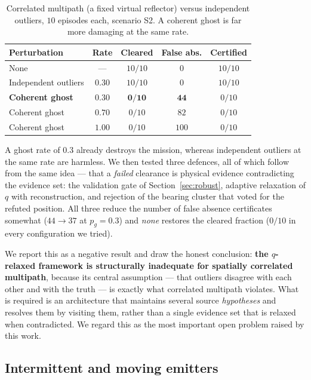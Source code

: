 \documentclass[journal,10pt]{IEEEtran}
\theoremstyle{definition}
\begin{document}
\begin{table}[t]
\caption{Correlated multipath (a fixed virtual reflector) versus independent outliers, $10$
episodes each, scenario S2. A coherent ghost is far more damaging at the same rate.}
\label{tab:ghost}
\centering
\small
\begin{tabular}{lcccc}
\toprule
Perturbation & Rate & Cleared & \textbf{False abs.} & Certified \\
\midrule
None                        & ---   & $10/10$ & $0$   & $10/10$ \\
Independent outliers        & $0.30$ & $10/10$ & $0$   & $10/10$ \\
\textbf{Coherent ghost}     & $0.30$ & $\bm{0/10}$ & $\bm{44}$ & $0/10$ \\
Coherent ghost              & $0.70$ & $0/10$ & $82$  & $0/10$ \\
Coherent ghost              & $1.00$ & $0/10$ & $100$ & $0/10$ \\
\bottomrule
\end{tabular}
\end{table}

A ghost rate of $0.3$ already destroys the mission, whereas independent outliers at the same rate
are harmless. We then tested three defences, all of which follow from the same idea --- that a
\emph{failed} clearance is physical evidence contradicting the evidence set: the validation gate of
Section~\ref{sec:robust}, adaptive relaxation of $q$ with reconstruction, and rejection of the
bearing cluster that voted for the refuted position. All three reduce the number of false absence
certificates somewhat ($44\to37$ at $p_g=0.3$) and \emph{none} restores the cleared fraction
($0/10$ in every configuration we tried).

We report this as a negative result and draw the honest conclusion: \textbf{the
$q$-relaxed framework is structurally inadequate for spatially correlated multipath}, because its
central assumption --- that outliers disagree with each other and with the truth --- is exactly
what correlated multipath violates. What is required is an architecture that maintains several
source \emph{hypotheses} and resolves them by visiting them, rather than a single evidence set that
is relaxed when contradicted. We regard this as the most important open problem raised by this
work.

\subsection{Intermittent and moving emitters}
\label{sec:burst}
\end{document}
